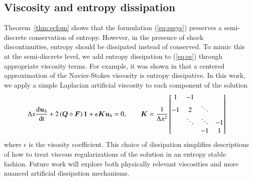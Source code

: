 \documentclass[preprint,10pt]{elsarticle}
\theoremstyle{definition}
\theoremstyle{lemma}
\theoremstyle{theorem}
\theoremstyle{assumption}
\newcommand{\td}[2]{\frac{{\rm d}#1}{{\rm d}{\rm #2}}}
\newcommand{\LRp}[1]{\left( #1 \right)}
\begin{document}
\subsection{Viscosity and entropy dissipation} 
\label{sec:entropydissipation}
Theorem~\ref{thm:ecfom} shows that the formulation (\ref{eq:essys}) preserves a semi-discrete conservation of entropy.  However, in the presence of shock discontinuities, entropy should be dissipated instead of conserved.  To mimic this at the semi-discrete level, we add entropy dissipation to (\ref{eq:es}) through appropriate viscosity terms.  For example, it was shown in \cite{tadmor2006entropy} that a centered approximation of the Navier-Stokes viscosity is entropy dissipative.  In this work, we apply a simple Laplacian artificial viscosity to each component of the solution \cite{upperman2019entropy}
\begin{equation}
\Delta x \td{\bm{u}_h}{t} + 2\LRp{{\bm{Q}}\circ \bm{F}}\bm{1} + \epsilon \bm{K}\bm{u}_h= 0, \qquad \bm{K} = \frac{1}{\Delta x^2} \begin{bmatrix}
1 & -1 & & \\
-1 & 2 & \ddots &\\
 & \ddots & \ddots & -1\\
 &  & -1& 1\\
\end{bmatrix}
\label{eq:esvisc}
\end{equation}
where $\epsilon$ is the visosity coefficient.  This choice of dissipation simplifies descriptions of how to treat viscous regularizations of the solution in an entropy stable fashion.  Future work will explore both physically relevant viscosities and more nuanced artificial dissipation mechanisms.  
\end{document}
